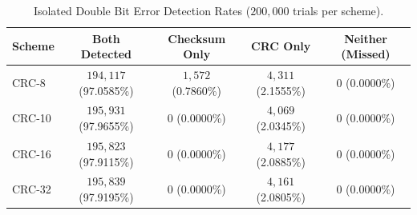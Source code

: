 \documentclass[11pt,a4paper]{article}
\begin{document}
\begin{table}[H]
    \centering
    \begin{tabular}{lcccc}
        \toprule
        \textbf{Scheme} & \textbf{Both Detected} & \textbf{Checksum Only} & \textbf{CRC Only} & \textbf{Neither (Missed)} \\
        \midrule
        CRC-8  & $194{,}117$ (97.0585\%) & $1{,}572$ (0.7860\%) & $4{,}311$ (2.1555\%) & 0 (0.0000\%) \\
        CRC-10 & $195{,}931$ (97.9655\%) & 0 (0.0000\%) & $4{,}069$ (2.0345\%) & 0 (0.0000\%) \\
        CRC-16 & $195{,}823$ (97.9115\%) & 0 (0.0000\%) & $4{,}177$ (2.0885\%) & 0 (0.0000\%) \\
        CRC-32 & $195{,}839$ (97.9195\%) & 0 (0.0000\%) & $4{,}161$ (2.0805\%) & 0 (0.0000\%) \\
        \bottomrule
    \end{tabular}
    \caption{Isolated Double Bit Error Detection Rates ($200{,}000$ trials per scheme).}
    \label{tab:double_bit}
\end{table}
\end{document}
